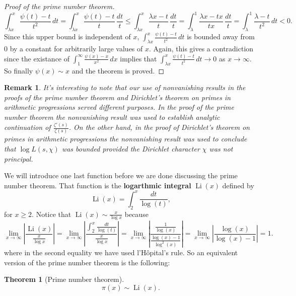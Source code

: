 \documentclass[12pt]{book}
\newtheorem{theorem}{Theorem}[section]
\newtheorem{remark}{Remark}[section]
\theoremstyle{definition}\newframedtheorem{method}{Method}
\newcommand{\z}{\zeta}
\renewcommand{\l}{\lambda}
\newcommand{\<}{\langle}
\renewcommand{\>}{\rangle}
\DeclareMathOperator{\Li}{\mathrm{Li}}
\begin{document}
\begin{proof}[Proof of the prime number theorem]
        \[
          \int_{\l x}^{x}\frac{\psi(t)-t}{t^{2}}\,dt = \int_{\l x}^{x}\frac{\psi(t)-t}{t}\,\frac{dt}{t} \le \int_{\l x}^{x}\frac{\l x-t}{t}\,\frac{dt}{t} = \int_{\l}^{1}\frac{\l x-tx}{tx}\,\frac{dt}{t} = \int_{\l}^{1}\frac{\l-t}{t^{2}}\,dt < 0.
        \]
        Since this upper bound is independent of $x$, $\int_{\l x}^{x}\frac{\psi(t)-t}{t^{2}}\,dt$ is bounded away from $0$ by a constant for arbitrarily large values of $x$. Again, this gives a contradiction since the existance of $\int_{1}^{\infty}\frac{\psi(x)-x}{x^{2}}\,dx$ implies that $\int_{\l x}^{x}\frac{\psi(t)-t}{t^{2}}\,dt \to 0$ as $x \to \infty$. So finally $\psi(x) \sim x$ and the theorem is proved.
      \end{proof}

      \begin{remark}
        It's interesting to note that our use of nonvanishing results in the proofs of the prime number theorem and Dirichlet's theorem on primes in arithmetic progressions served different purposes. In the proof of the prime number theorem the nonvanishing result was used to establish analytic continuation of $\frac{\z'(s)}{\z(s)}$. On the other hand, in the proof of Dirichlet's theorem on primes in arithmetic progressions the nonvanishing result was used to conclude that $\log L(s,\chi)$ was bounded provided the Dirichlet character $\chi$ was not principal.
      \end{remark}

      We will introduce one last function before we are done discussing the prime number theorem. That function is the \textbf{logarthmic integral} $\Li(x)$ defined by
      \[
        \Li(x) = \int_{2}^{x}\frac{dt}{\log(t)},
      \]
      for $x \ge 2$. Notice that $\Li(x) \sim \frac{x}{\log{x}}$ because
      \[
        \lim_{x \to \infty}\left|\frac{\Li(x)}{\frac{x}{\log{x}}}\right| = \lim_{x \to \infty}\left|\frac{\int_{2}^{x}\frac{dt}{\log(t)}}{\frac{x}{\log{x}}}\right| = \lim_{x \to \infty}\left|\frac{\frac{1}{\log(x)}}{\frac{\log(x)-1}{\log^{2}(x)}}\right| = \lim_{x \to \infty}\left|\frac{\log(x)}{\log(x)-1}\right| = 1.
      \]
      where in the second equality we have used  l'H\^opital's rule. So an equivalent version of the prime number theorem is the following:

      \begin{theorem}[Prime number theorem]
        \phantom{ }
        \[
          \pi(x) \sim \Li(x).
        \]
      \end{theorem}
\end{document}
